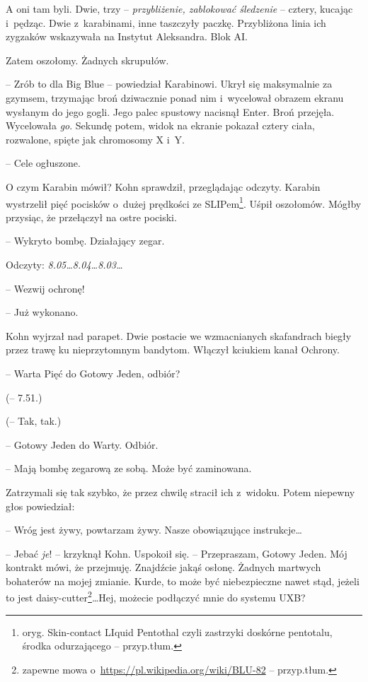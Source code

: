 \documentclass[oneside,polish,11pt,sfheadings]{mwbk}
\begin{document}
A oni tam byli. Dwie, trzy -- \emph{przybliżenie, zablokować śledzenie} -- cztery, kucając i~pędząc. Dwie z~karabinami, inne taszczyły paczkę.
Przybliżona linia ich zygzaków wskazywała na Instytut Aleksandra. Blok
AI.

Zatem oszołomy. Żadnych skrupułów.

-- Zrób to dla Big Blue -- powiedział Karabinowi. Ukrył się maksymalnie za
gzymsem, trzymając broń dziwacznie ponad nim i~wycelował obrazem ekranu
wysłanym do jego gogli. Jego palec spustowy nacisnął Enter. Broń
przejęła. Wycelowała \emph{go}. Sekundę potem, widok na ekranie pokazał
cztery ciała, rozwalone, spięte jak chromosomy X i~Y.

-- Cele ogłuszone.

O czym Karabin mówił? Kohn sprawdził, przeglądając odczyty. Karabin
wystrzelił pięć pocisków o~dużej prędkości ze SLIPem\footnote{oryg. Skin-contact
LIquid Pentothal czyli zastrzyki doskórne pentotalu, środka odurzającego -- przyp.tłum.}. Uśpił oszołomów. Mógłby
przysiąc, że przełączył na ostre pociski.

-- Wykryto bombę. Działający zegar. 

Odczyty: \emph{8.05\ldots 8.04\ldots 8.03\ldots}

-- Wezwij ochronę!

-- Już wykonano.

Kohn wyjrzał nad parapet. Dwie postacie we wzmacnianych skafandrach
biegły przez trawę ku nieprzytomnym bandytom. Włączył kciukiem kanał
Ochrony.

-- Warta Pięć do Gotowy Jeden, odbiór?

(-- 7.51.)

(-- Tak, tak.)

-- Gotowy Jeden do Warty. Odbiór.

-- Mają bombę zegarową ze sobą. Może być zaminowana.

Zatrzymali się tak szybko, że przez chwilę stracił ich z~widoku. Potem
niepewny głos powiedział: 

-- Wróg jest żywy, powtarzam żywy. Nasze
obowiązujące instrukcje\ldots

-- Jebać \emph{je}! -- krzyknął Kohn. Uspokoił się. -- Przepraszam, Gotowy
Jeden. Mój kontrakt mówi, że przejmuję. Znajdźcie jakąś osłonę. Żadnych
martwych bohaterów na mojej zmianie. Kurde, to może być niebezpieczne
nawet stąd, jeżeli to jest daisy-cutter\footnote{zapewne mowa o~\url{https://pl.wikipedia.org/wiki/BLU-82} -- przyp.tłum.}\ldots  Hej, możecie
podłączyć mnie do systemu UXB?
\end{document}
